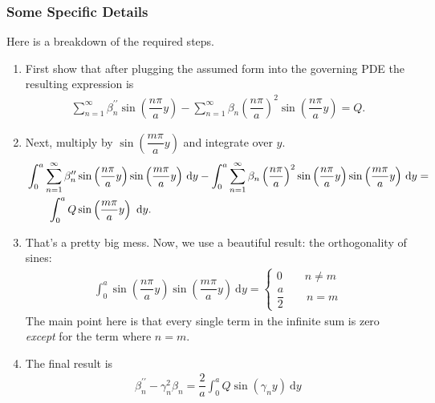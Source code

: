 \documentclass[11pt]{article}
\begin{document}
    \subsubsection{Some Specific Details}
    Here is a breakdown of the required steps.
    \begin{enumerate}
      \item First show that after plugging the assumed form into the governing PDE the resulting expression is 
      \begin{align}
        \sum_{n=1}^{\infty}{\beta_{n}^{\prime\prime}\sin\left(\dfrac{n\pi}{a}y\right)} -
\sum_{n=1}^{\infty}{\beta_{n}\left(\dfrac{n\pi}{a}\right)^{2}\sin\left(\dfrac{n\pi}{a}y\right)} = Q.
      \end{align}
      \item Next, multiply by $\sin\left(\dfrac{m\pi}{a}y\right)$ and integrate over $y$.
      \begin{align}
        &\int_{0}^{a}{\sum_{n=1}^{\infty}{\beta_{n}^{\prime\prime}\sin\left(\dfrac{n\pi}{a}y\right)\sin\left(\dfrac{m\pi}{a}y\right)}
\ \mathrm{d}y} -
\int_{0}^{a}{\sum_{n=1}^{\infty}{\beta_{n}\left(\dfrac{n\pi}{a}\right)^{2}\sin\left(\dfrac{n\pi}{a}y\right)\sin\left(\dfrac{m\pi}{a}y\right)}
\ \mathrm{d}y} = \nonumber \\
        &\hspace{2.0em}\int_{0}^{a}{Q\sin\left(\dfrac{m\pi}{a}y\right) \ \mathrm{d}y}.
      \end{align}
      \item That's a pretty big mess.  Now, we use a beautiful result:  the orthogonality of sines:
        \begin{align}
          \int_{0}^{a}{\sin\left(\dfrac{n\pi}{a}y\right)\sin\left(\dfrac{m\pi}{a}y\right) \ \mathrm{d}y} = 
          \left\{
            \begin{array}{ll}
              0            \qquad n \neq m \\
              \dfrac{a}{2} \qquad n = m
            \end{array}
          \right.
        \end{align}
        The main point here is that every single term in the infinite sum is zero \textit{except} for the term where $n=m$.
      \item The final result is 
        \begin{align}
          \beta_{n}^{\prime\prime} - \gamma_{n}^{2}\beta_{n} = \dfrac{2}{a}\int_{0}^{a}{Q\sin\left(\gamma_{n}y\right) \ \mathrm{d}y}
        \end{align}
    \end{enumerate}
\end{document}
